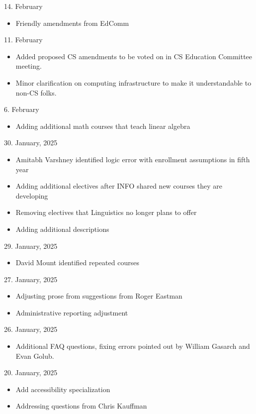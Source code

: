 14. February

\begin{itemize}
    \item Friendly amendments from EdComm
\end{itemize}

11. February

\begin{itemize}
    \item Added proposed CS amendments to be voted on in CS Education Committee meeting.
    \item Minor clarification on computing infrastructure to make it understandable to non-CS folks.
\end{itemize}

6. February
\begin{itemize}
  \item Adding additional math courses that teach linear algebra
\end{itemize}

30. January, 2025
\begin{itemize}
  \item Amitabh Varshney identified logic error with enrollment assumptions in fifth year
  \item Adding additional electives after INFO shared new courses they are developing
  \item Removing electives that Linguistics no longer plans to offer 
  \item Adding additional descriptions
\end{itemize}

29. January, 2025
\begin{itemize}
  \item David Mount identified repeated courses
\end{itemize}

27. January, 2025
\begin{itemize}
    \item Adjusting prose from suggestions from Roger Eastman
    \item Administrative reporting adjustment
\end{itemize}

26. January, 2025
\begin{itemize}
  \item Additional FAQ questions, fixing errors pointed out by William Gasarch and Evan Golub.
\end{itemize}

20. January, 2025
\begin{itemize}
 \item Add accessibility specialization
 \item Addressing questions from Chris Kauffman
\end{itemize}

